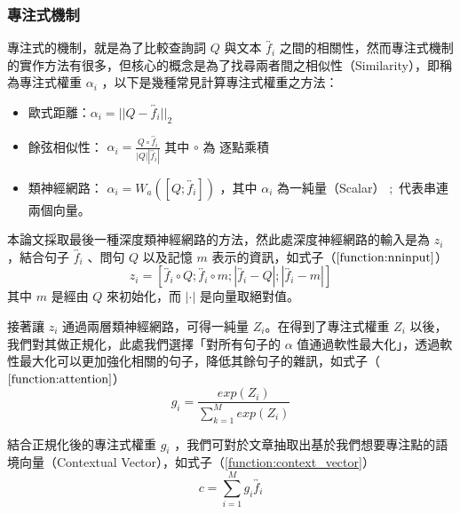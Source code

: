\subsubsection{專注式機制}
專注式的機制，就是為了比較查詢詞 $Q$ 與文本 $\overleftrightarrow{f_i}$ 之間的相關性，然而專注式機制的實作方法有很多，但核心的概念是為了找尋兩者間之相似性（Similarity），即稱為專注式權重 $\alpha_i$ ，以下是幾種常見計算專注式權重之方法：
\itemsep -4pt
\begin{itemize}
    \item 歐式距離：$\alpha_i = ||Q-\overleftrightarrow{f_i}||_{2}$
    \item 餘弦相似性：
            $\alpha_i = \frac{Q \circ \overleftrightarrow{f_i} }{|Q| |\overleftrightarrow{f_i}| } $ 其中 $\circ$ 為 逐點乘積
    \item 類神經網路： $\alpha_i = W_a ([Q ; \overleftrightarrow{f_i}]) $ 
        ，其中 $\alpha_i$ 為一純量（Scalar） $;$ 代表串連兩個向量。
\end{itemize}
本論文採取最後一種深度類神經網路的方法，然此處深度神經網路的輸入是為 $z_i$ ，結合句子 $\overleftrightarrow{f_i}$ 、問句 $Q$ 以及記憶 $m$ 表示的資訊，如式子（$\ref{function:nninput}$）
\begin{equation}
    z_i = [ \overleftrightarrow{f_i} \circ Q ; \overleftrightarrow{f_i} \circ m ; |\overleftrightarrow{f_i} - Q| ; | \overleftrightarrow{f_i} - m| ] \label{function:nninput}
\end{equation}
其中 $m$ 是經由 $Q$ 來初始化，而 $|\cdot|$ 是向量取絕對值。

接著讓 $z_i$ 通過兩層類神經網路，可得一純量 $Z_i$。在得到了專注式權重 $Z_i$ 以後，我們對其做正規化，此處我們選擇「對所有句子的 $\alpha$ 值通過軟性最大化」，透過軟性最大化可以更加強化相關的句子，降低其餘句子的雜訊，如式子（$\ref{function:attention}$）
\begin{equation}
    g_i = \frac{exp{(Z_i)}}{\sum_{k=1}^{M} exp(Z_i)} \label{function:attention}
\end{equation}

結合正規化後的專注式權重 $g_i$ ，我們可對於文章抽取出基於我們想要專注點的語境向量（Contextual Vector），如式子（\ref{function:context_vector}）
\begin{equation}
    c = \sum_{i=1}^{M} g_i \overleftrightarrow{f_i} \label{function:context_vector}
\end{equation}
